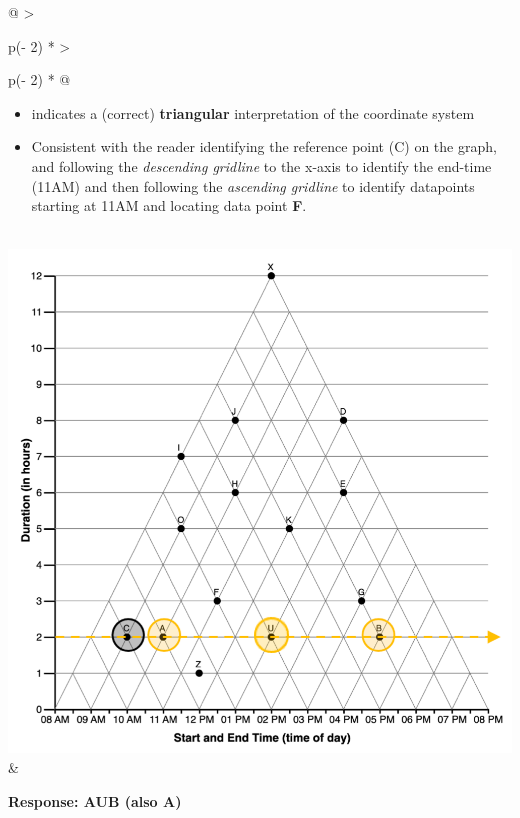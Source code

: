 \documentclass[
  letterpaper,
  DIV=11,
  numbers=noendperiod]{scrreprt}
\providecommand{\tightlist}{%
  \setlength{\itemsep}{0pt}\setlength{\parskip}{0pt}}\usepackage{longtable,booktabs,array}
\begin{document}
\begin{longtable}[]{@{}
  >{\raggedright\arraybackslash}p{(\columnwidth - 2\tabcolsep) * }
  >{\raggedright\arraybackslash}p{(\columnwidth - 2\tabcolsep) * }@{}}
\begin{minipage}[t]{\linewidth}
\begin{itemize}
\tightlist
\item
  indicates a (correct) \textbf{triangular} interpretation of the
  coordinate system
\item
  Consistent with the reader identifying the reference point (C) on the
  graph, and following the \emph{descending gridline} to the x-axis to
  identify the end-time (11AM) and then following the \emph{ascending
  gridline} to identify datapoints starting at 11AM and locating data
  point \textbf{F}.
\end{itemize}
\end{minipage} \\
\includegraphics{analysis/SGC3A/static/interpretations/Q3_111_AUB.png} &
\begin{minipage}[t]{\linewidth}\raggedright
\textbf{Response: AUB (also A)}


\end{minipage}
\end{longtable}
\end{document}
